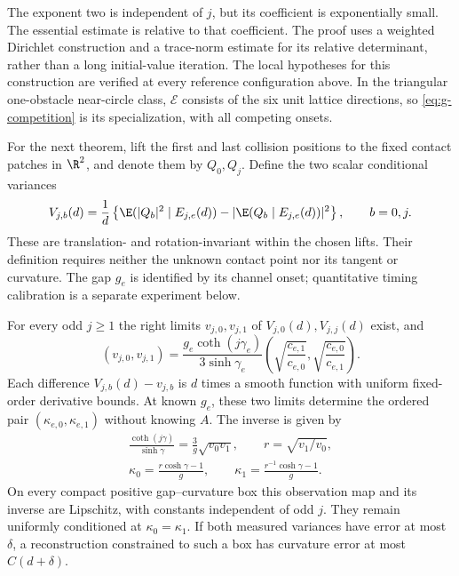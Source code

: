 The exponent two is independent of $j$, but its coefficient is
exponentially small. The essential estimate is relative to that
coefficient. The proof uses a weighted Dirichlet construction and a
trace-norm estimate for its relative determinant, rather than a
long initial-value iteration. The local hypotheses for this construction
are verified at every reference configuration above. In the triangular
one-obstacle near-circle class, $\mathcal E$ consists of the six unit
lattice directions, so \eqref{eq:g-competition} is its specialization, with all competing onsets.

For the next theorem, lift the first and last collision positions to
the fixed contact patches in $\R^2$, and denote them by $Q_0,Q_j$.
Define the two scalar conditional variances
\begin{equation}\label{eq:v3-observed-variance}
 V_{j,b}(d)=\frac1d\left\{
 \E(|Q_b|^2\mid E_{j,e}(d))-
       |\E(Q_b\mid E_{j,e}(d))|^2\right\},\qquad b=0,j.
\end{equation}
These are translation- and rotation-invariant within the chosen lifts.
Their definition requires neither the unknown contact point nor its
tangent or curvature. The gap $g_e$ is identified by its channel onset; quantitative timing
calibration is a separate experiment below.

\begin{theorem}
\label{thm:v3-tomography}
For every odd $j\ge1$ the right limits $v_{j,0},v_{j,1}$ of
$V_{j,0}(d),V_{j,j}(d)$ exist, and
\begin{equation}\label{eq:v3-variance-limits}
 (v_{j,0},v_{j,1})=
 \frac{g_e\coth(j\gamma_e)}{3\sinh\gamma_e}
 \left(\sqrt{\frac{c_{e,1}}{c_{e,0}}},
       \sqrt{\frac{c_{e,0}}{c_{e,1}}}\right).
\end{equation}
Each difference $V_{j,b}(d)-v_{j,b}$ is $d$ times a smooth function
with uniform fixed-order derivative bounds. At known $g_e$, these two
limits determine the ordered pair $(\kappa_{e,0},\kappa_{e,1})$ without
knowing $A$. The inverse is given by
\begin{equation}\label{eq:v3-inverse-map}
 \begin{gathered}
 \frac{\coth(j\gamma)}{\sinh\gamma}
        =\frac3g\sqrt{v_0v_1},\qquad
 r=\sqrt{v_1/v_0},\\
 \kappa_0=\frac{r\cosh\gamma-1}{g},\qquad
 \kappa_1=\frac{r^{-1}\cosh\gamma-1}{g}.
 \end{gathered}
\end{equation}
On every compact positive gap--curvature box this observation map and
its inverse are Lipschitz, with constants independent of odd $j$.
They remain uniformly conditioned at $\kappa_0=\kappa_1$.
If both measured variances have error at most $\delta$, a reconstruction
constrained to such a box has curvature error at most $C(d+\delta)$.
\end{theorem}

